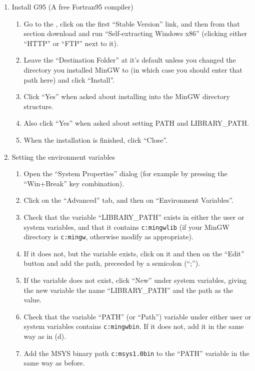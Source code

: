 \begin{enumerate}
\item Install G95 (A free Fortran95 compiler)
    \begin{enumerate}
    \item Go to the , click on the first ``Stable 
Version'' link, and then from that section download and run ``Self-extracting Windows x86'' 
(clicking either ``HTTP'' or ``FTP'' next to it).
    \item Leave the ``Destination Folder'' at it's default unless you changed the directory you 
installed MinGW to (in which case you should enter that path here) and click ``Install''.
    \item Click ``Yes'' when asked about installing into the MinGW directory structure.
    \item Also click ``Yes'' when asked about setting PATH and LIBRARY\_PATH.
    \item When the installation is finished, click ``Close''.
    \end{enumerate}

\item Setting the environment variables
    \begin{enumerate}
    \item Open the ``System Properties'' dialog (for example by pressing the ``Win+Break'' key 
combination).
    \item Click on the ``Advanced'' tab, and then on ``Environment Variables''.
    \item Check that the variable ``LIBRARY\_PATH'' exists in either the user or system variables, 
and that it contains \texttt{c:\bslash{}mingw\bslash{}lib} (if your MinGW directory is 
\texttt{c:\bslash{}mingw}, otherwise modify as appropriate).
    \item If it does not, but the variable exists, click on it and then on the ``Edit'' button and 
    add the path, preceeded by a semicolon (``;'').
    \item If the variable does not exist, click ``New'' under system variables, giving the new 
variable the name ``LIBRARY\_PATH'' and the path as the value.
    \item Check that the variable ``PATH'' (or ``Path'') variable under either user or system 
variables contains \texttt{c:\bslash{}mingw\bslash{}bin}.  If it does not, add it in the same way as 
in (d).
    \item Add the MSYS binary path \texttt{c:\bslash{}msys\bslash{}1.0\bslash{}bin} to the ``PATH'' 
variable in the same way as before.
    \end{enumerate}

\end{enumerate}

